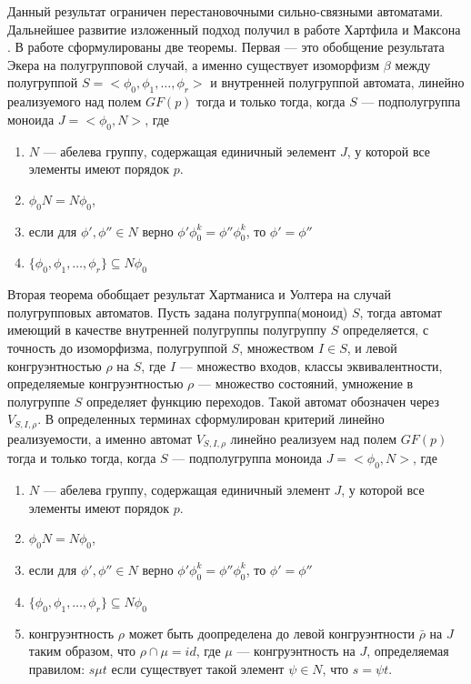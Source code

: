 Данный результат ограничен перестановочными сильно-связными автоматами. Дальнейшее развитие изложенный подход получил в работе Хартфила и Максона \cite{hartfiel_maxson}. В работе сформулированы две теоремы. Первая --- это обобщение результата Экера на полугрупповой случай, а именно существует изоморфизм $\beta$ между полугруппой $S=<\phi_0,\phi_1,\ldots,\phi_r>$ и внутренней полугруппой автомата, линейно реализуемого над полем $GF(p)$ тогда и только тогда, когда $S$ --- подполугруппа моноида $J=<\phi_0,N>$, где
\begin{enumerate}
\item $N$ --- абелева группу, содержащая единичный эелемент $J$, у которой все элементы имеют порядок $p$.
\item $\phi_0 N=N\phi_0$,
\item если для $\phi',\phi''\in N$ верно $\phi'\phi_0^k=\phi''\phi_0^k$, то $\phi'=\phi''$
\item $\{\phi_0,\phi_1,\ldots,\phi_r\}\subseteq N\phi_0$
\end{enumerate}
Вторая теорема обобщает результат Хартманиса и Уолтера на случай полугрупповых автоматов. Пусть задана полугруппа(моноид) $S$, тогда автомат имеющий в качестве внутренней полугруппы полугруппу $S$ определяется, с точность до изоморфизма, полугруппой $S$, множеством $I\in S$, и левой конгруэнтностью $\rho$ на $S$, где $I$ --- множество входов, классы эквивалентности, определяемые конгруэнтностью $\rho$ --- множество состояний, умножение в полугруппе $S$ определяет функцию переходов. Такой автомат обозначен через $V_{S,I,\rho}$. 
В определенных терминах сформулирован критерий линейно реализуемости, а именно автомат $V_{S,I,\rho}$ линейно реализуем над полем $GF(p)$ тогда и только тогда, когда $S$ --- подполугруппа моноида $J=<\phi_0,N>$, где
\begin{enumerate}
\item $N$ --- абелева группу, содержащая единичный элемент $J$, у которой все элементы имеют порядок $p$.
\item $\phi_0 N=N\phi_0$,
\item если для $\phi',\phi''\in N$ верно $\phi'\phi_0^k=\phi''\phi_0^k$, то $\phi'=\phi''$
\item $\{\phi_0,\phi_1,\ldots,\phi_r\}\subseteq N\phi_0$
\item конгруэнтность $\rho$ может быть доопределена до левой конгруэнтности $\bar{\rho}$ на $J$ таким образом, что $\rho\cap\mu=id$, где $\mu$ --- конгруэнтность на $J$, определяемая правилом: $s\mu t$ если существует такой элемент $\psi\in N$, что $s=\psi t$.
\end{enumerate}
